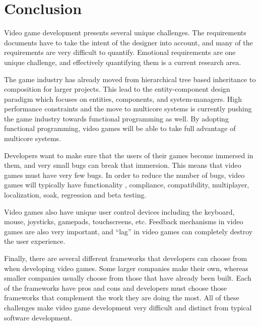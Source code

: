 \section{Conclusion}
Video game development presents several unique challenges. The requirements documents have to take the intent of the designer into account, and many of the requirements are very difficult to quantify. Emotional requirements are one unique challenge, and effectively quantifying them is a current research area. 

The game industry has already moved from hierarchical tree based inheritance to composition for larger projects. This lead to the entity-component design paradigm which focuses on entities, components, and system-managers. High performance constraints and the move to multicore systems is currently pushing the game industry towards functional programming as well. By adopting functional programming, video games will be able to take full advantage of multicore systems.

Developers want to make sure that the users of their games become immersed in them, and very small bugs can break that immersion. This means that video games must have very few bugs. In order to reduce the number of bugs, video games will typically have functionality , compliance, compatibility, multiplayer, localization, soak, regression and beta testing.

Video games also have unique user control devices including the keyboard, mouse, joysticks, gamepads, touchscreens, etc. Feedback mechanisms in video games are also very important, and ``lag'' in video games can completely destroy the user experience. 

Finally, there are several different frameworks that developers can choose from when developing video games. Some larger companies make their own, whereas smaller companies usually choose from those that have already been built. Each of the frameworks have pros and cons and developers must choose those frameworks that complement the work they are doing the most. All of these challenges make video game development very difficult and distinct from typical software development.
